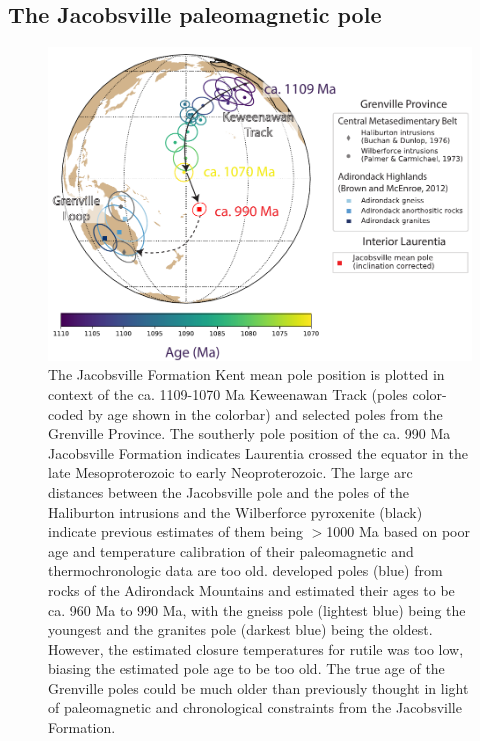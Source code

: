 \documentclass[draft]{agujournal2019}
\begin{document}
\subsection*{The Jacobsville paleomagnetic pole}

\begin{figure}[h!]
\centering
\includegraphics[width=\textwidth]{Jacobsville_pole_plot.pdf}
\caption{The Jacobsville Formation Kent mean pole position is plotted in context of the ca. 1109-1070 Ma Keweenawan Track (poles color-coded by age shown in the colorbar) and selected poles from the Grenville Province. The southerly pole position of the ca. 990 Ma Jacobsville Formation indicates Laurentia crossed the equator in the late Mesoproterozoic to early Neoproterozoic. The large arc distances between the Jacobsville pole and the poles of the Haliburton intrusions \cite{Buchan1976a} and the Wilberforce pyroxenite \cite{Palmer1973a} (black) indicate previous estimates of them being $>$1000 Ma \cite{Halls2015b} based on poor age and temperature calibration of their paleomagnetic and thermochronologic data are too old.  developed poles (blue) from rocks of the Adirondack Mountains and estimated their ages to be ca. 960 Ma to 990 Ma, with the gneiss pole (lightest blue) being the youngest and the granites pole (darkest blue) being the oldest. However, the estimated closure temperatures for rutile was too low, biasing the estimated pole age to be too old. The true age of the Grenville poles could be much older than previously thought in light of paleomagnetic and chronological constraints from the Jacobsville Formation. }
\label{fig:pole_plot}
\end{figure}
\end{document}
